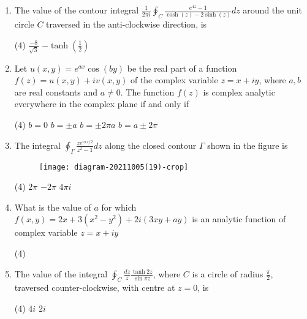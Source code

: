 \begin{enumerate}[label=\color{ocre}\textbf{\arabic*.}]
	\item The value of the contour integral $\frac{1}{2 \pi i} \oint_{C} \frac{e^{4 z}-1}{\cosh (z)-2 \sinh (z)} d z$ around the unit circle $C$ traversed in the anti-clockwise direction, is
	{}
	\begin{tasks}(4)
		\task[\textbf{C.}] $\frac{-8}{\sqrt{3}}$
		\task[\textbf{D.}] $-\tanh \left(\frac{1}{2}\right)$
	\end{tasks}
	
	\item  Let $u(x, y)=e^{a x} \cos (b y)$ be the real part of a function $f(z)=u(x, y)+i v(x, y)$ of the complex variable $z=x+i y$, where $a, b$ are real constants and $a \neq 0 .$ The function $f(z)$ is complex analytic everywhere in the complex plane if and only if
	{}
	\begin{tasks}(4)
		\task[\textbf{A.}] $b=0$
		\task[\textbf{B.}] $b=\pm a$
		\task[\textbf{C.}] $b=\pm 2 \pi a$
		\task[\textbf{D.}]  $b=a \pm 2 \pi$
	\end{tasks}
	
	\item  The integral $\oint_{\Gamma} \frac{z e^{i \pi z / 2}}{z^{2}-1} d z$ along the closed contour $\Gamma$ shown in the figure is
	{}
	\begin{figure}[H]
		\centering
		\texttt{[image: diagram-20211005(19)-crop]}
	\end{figure}
	\begin{tasks}(4)
		\task[\textbf{B.}] $2 \pi$
		\task[\textbf{C.}] $-2 \pi$
		\task[\textbf{D.}] $4 \pi i$
	\end{tasks}
	
	\item What is the value of $a$ for which $f(x, y)=2 x+3\left(x^{2}-y^{2}\right)+2 i(3 x y+a y)$ is an analytic function of complex variable $z=x+i y$
	{}
	\begin{tasks}(4)
	\end{tasks}

	\item  The value of the integral $\oint_{C} \frac{d z}{z} \frac{\tanh 2 z}{\sin \pi z}$, where $C$ is a circle of radius $\frac{\pi}{2}$, traversed counter-clockwise, with centre at $z=0$, is
	{}
	\begin{tasks}(4)
		\task[\textbf{B.}] $4 i$
		\task[\textbf{C.}] $2 i$
	\end{tasks}
	

\end{enumerate}
